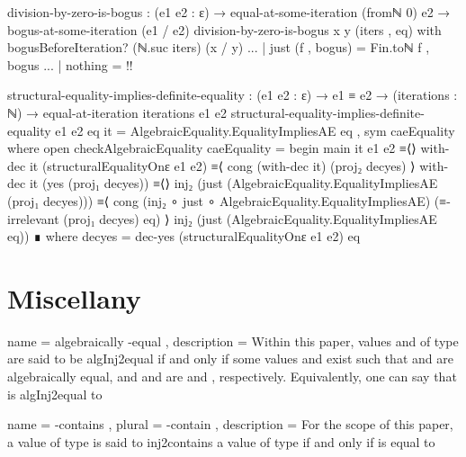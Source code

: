 \documentclass{report}
\begin{document}
\begin{code}
  division-by-zero-is-bogus :
    (e1 e2 : ε) →
    equal-at-some-iteration (fromℕ 0) e2 →
    bogus-at-some-iteration (e1 / e2)
  division-by-zero-is-bogus x y (iters , eq) with bogusBeforeIteration? (ℕ.suc iters) (x / y)
  ... | just (f , bogus) = Fin.toℕ f , bogus
  ... | nothing = {!!}

  structural-equality-implies-definite-equality :
    (e1 e2 : ε) →
    e1 ≡ e2 →
    (iterations : ℕ) →
    equal-at-iteration iterations e1 e2
  structural-equality-implies-definite-equality e1 e2 eq it =
    AlgebraicEquality.EqualityImpliesAE eq , sym caeEquality
    where
    open checkAlgebraicEquality
    caeEquality = begin
      main it e1 e2
        ≡⟨⟩
      with-dec it (structuralEqualityOnε e1 e2)
        ≡⟨ cong (with-dec it) (proj₂ decyes) ⟩
      with-dec it (yes (proj₁ decyes))
        ≡⟨⟩
      inj₂ (just (AlgebraicEquality.EqualityImpliesAE (proj₁ decyes)))
        ≡⟨ cong (inj₂ ∘ just ∘ AlgebraicEquality.EqualityImpliesAE)
                (≡-irrelevant (proj₁ decyes) eq) ⟩
      inj₂ (just (AlgebraicEquality.EqualityImpliesAE eq)) ∎
      where
      decyes = dec-yes (structuralEqualityOnε e1 e2) eq
\end{code}

\part{Miscellany}

\printbibliography{}

  { name = algebraically -equal
  , description = {Within this paper, values  and  of type    are said to be \gls{algInj2equal} if and only if some values  and  exist such that  and  are algebraically equal, and  and  are   and  , respectively.  Equivalently, one can say that  is \gls{algInj2equal} to }
  }

  { name = -contains
  , plural = -contain
  , description = {For the scope of this paper, a value  of type    is said to \glspl{inj2contain} a value  of type  if and only if  is equal to  }
  }
\end{document}
